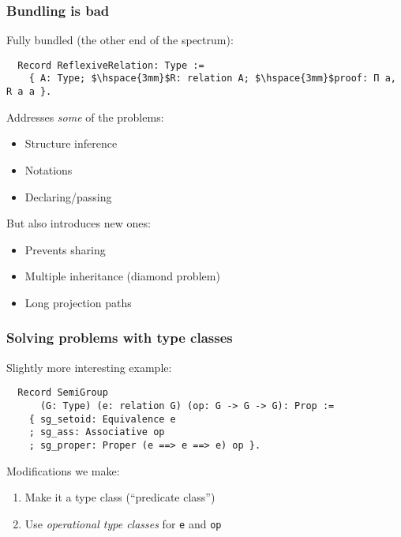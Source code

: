 \documentclass{beamer}
\begin{document}
\begin{frame}[fragile]
\frametitle{Bundling is bad}

Fully {\color{blue}bundled} (the other end of the spectrum):
\begin{lstlisting}
  Record ReflexiveRelation: Type :=
    { A: Type; $\hspace{3mm}$R: relation A; $\hspace{3mm}$proof: Π a, R a a }.
\end{lstlisting}
Addresses \emph{some} of the problems:
\begin{itemize}
\item Structure inference %
\item Notations %
\item Declaring/passing
\end{itemize}
\pause
But also introduces new ones:
\begin{itemize}
\item Prevents sharing
\item Multiple inheritance (diamond problem)
\item Long projection paths
\end{itemize}
\end{frame}

\begin{frame}[fragile]
\frametitle{Solving problems with type classes}

Slightly more interesting example:
\begin{lstlisting}
  Record SemiGroup
      (G: Type) (e: relation G) (op: G -> G -> G): Prop :=
    { sg_setoid: Equivalence e
    ; sg_ass: Associative op
    ; sg_proper: Proper (e ==> e ==> e) op }.
\end{lstlisting}

\pause

Modifications we make:
\begin{enumerate}
\item Make it a type class (``predicate class'')
\item Use \emph{operational type classes} for \lstinline|e| and \lstinline|op|
\end{enumerate}

\end{frame}
\end{document}
